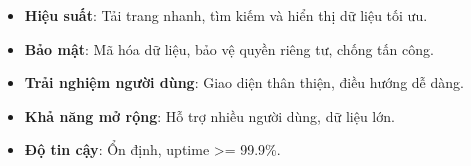 
\begin{itemize}
    \renewcommand{\labelitemi}{-}
    \item \textbf{Hiệu suất}: Tải trang nhanh, tìm kiếm và hiển thị dữ liệu tối ưu.
    \item \textbf{Bảo mật}: Mã hóa dữ liệu, bảo vệ quyền riêng tư, chống tấn công.
    \item \textbf{Trải nghiệm người dùng}: Giao diện thân thiện, điều hướng dễ dàng.
    \item \textbf{Khả năng mở rộng}: Hỗ trợ nhiều người dùng, dữ liệu lớn.
    \item \textbf{Độ tin cậy}: Ổn định, uptime >= 99.9\%.
\end{itemize}
